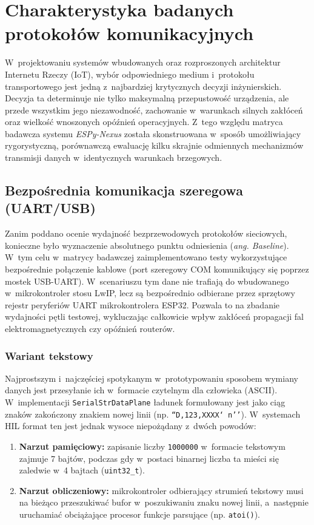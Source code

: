 \chapter{Charakterystyka badanych protokołów komunikacyjnych}
\label{chap:protokoly}

W~projektowaniu systemów wbudowanych oraz rozproszonych architektur Internetu Rzeczy (IoT), wybór odpowiedniego medium i~protokołu transportowego jest jedną z~najbardziej krytycznych decyzji inżynierskich.
Decyzja ta determinuje nie tylko maksymalną przepustowość urządzenia, ale przede wszystkim jego niezawodność, zachowanie w~warunkach silnych zakłóceń oraz wielkość wnoszonych opóźnień operacyjnych.
Z~tego względu matryca badawcza systemu \textit{ESPy-Nexus} została skonstruowana w~sposób umożliwiający rygorystyczną, porównawczą ewaluację kilku skrajnie odmiennych mechanizmów transmisji danych w~identycznych warunkach brzegowych.

\section{Bezpośrednia komunikacja szeregowa (UART/USB)}
\label{sec:protokol_serial}

Zanim poddano ocenie wydajność bezprzewodowych protokołów sieciowych, konieczne było wyznaczenie absolutnego punktu odniesienia (\textit{ang. Baseline}).
W~tym celu w~matrycy badawczej zaimplementowano testy wykorzystujące bezpośrednie połączenie kablowe (port szeregowy COM komunikujący się poprzez mostek USB-UART).
W~scenariuszu tym dane nie trafiają do wbudowanego w~mikrokontroler stosu LwIP, lecz są bezpośrednio odbierane przez sprzętowy rejestr peryferiów UART mikrokontrolera ESP32.
Pozwala to na zbadanie wydajności pętli testowej, wykluczając całkowicie wpływ zakłóceń propagacji fal elektromagnetycznych czy opóźnień routerów.

\subsection{Wariant tekstowy}

Najprostszym i~najczęściej spotykanym w~prototypowaniu sposobem wymiany danych jest przesyłanie ich w~formacie czytelnym dla człowieka (ASCII).
W~implementacji \texttt{SerialStrDataPlane} ładunek formułowany jest jako ciąg znaków zakończony znakiem nowej linii (np. \texttt{``D,123,XXXX\char`\\n''}).
W~systemach HIL format ten jest jednak wysoce niepożądany z~dwóch powodów:
\begin{enumerate}
    \item \textbf{Narzut pamięciowy:}
          zapisanie liczby \texttt{1000000} w~formacie tekstowym zajmuje 7 bajtów, podczas gdy w~postaci binarnej liczba ta mieści się zaledwie w~4 bajtach (\texttt{uint32\_t}).
    \item \textbf{Narzut obliczeniowy:}
          mikrokontroler odbierający strumień tekstowy musi na bieżąco przeszukiwać bufor w~poszukiwaniu znaku nowej linii, a~następnie uruchamiać obciążające procesor funkcje parsujące (np. \texttt{atoi()}).
\end{enumerate}

